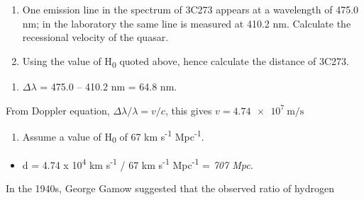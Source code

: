 \documentclass[revision-guide.tex]{subfiles}
\begin{document}
\begin{example}

\begin{enumerate}
\def\labelenumi{\arabic{enumi}.}
\item
  One emission line in the spectrum of 3C273 appears at a wavelength of
  475.0 nm; in the laboratory the same line is measured at 410.2 nm.
  Calculate the recessional velocity of the quasar.
\item
  Using the value of H\textsubscript{0} quoted above, hence calculate
  the distance of 3C273.
\end{enumerate}

\answer

\begin{enumerate}
\def\labelenumi{\arabic{enumi}.}
\item
  $\Delta\lambda$ = 475.0 -- 410.2 nm = 64.8 nm.
\end{enumerate}

From Doppler equation, $\Delta\lambda/\lambda = v/c$, this gives $v=\SI{4.74e7}{\meter\per\second}$


\begin{enumerate}
\def\labelenumi{\arabic{enumi}.}
\item
  Assume a value of H\textsubscript{0} of 67 km s\textsuperscript{-1}
  Mpc\textsuperscript{-1}.
\end{enumerate}

\begin{itemize}
\item
  d = 4.74 x 10\textsuperscript{4} km s\textsuperscript{-1} / 67 km
  s\textsuperscript{-1} Mpc\textsuperscript{-1} = \emph{707 Mpc.}
\end{itemize}


\end{example}
In the 1940s, George Gamow suggested that the observed ratio of hydrogen
\end{document}
